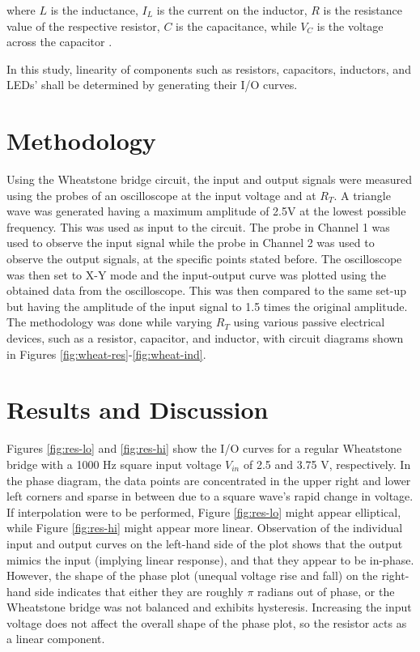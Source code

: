 \documentclass[12pt,a4paper,twoside]{article}
\begin{document}
where $L$ is the inductance, $I_L$ is the current on the inductor, $R$ is the resistance value of the respective resistor, $C$ is the capacitance, while $V_C$ is the voltage across the capacitor \cite{1stODE}.  

In this study, linearity of components such as resistors, capacitors, inductors, and LEDs' shall be determined by generating their I/O curves.

\medskip

\section{Methodology}
\label{sec:Metho}
Using the Wheatstone bridge circuit, the input and output signals were measured using the probes of an oscilloscope at the input voltage and at $R_T$. A triangle wave was generated having a maximum amplitude of 2.5\si{\volt} at the lowest possible frequency. This was used as input to the circuit. The probe in Channel 1 was used to observe the input signal while the probe in Channel 2 was used to observe the output signals, at the specific points stated before. The oscilloscope was then set to X-Y mode and the input-output curve was plotted using the obtained data from the oscilloscope. This was then compared to the same set-up but having the amplitude of the input signal to 1.5 times the original amplitude. The methodology was done while varying $R_T$ using various passive electrical devices, such as a resistor, capacitor, and inductor, with circuit diagrams shown in Figures \ref{fig:wheat-res}-\ref{fig:wheat-ind}.

\section{Results and Discussion}
\label{sec:RnD}
\medskip
Figures \ref{fig:res-lo} and \ref{fig:res-hi} show the I/O curves for a regular Wheatstone bridge with a 1000 Hz square input voltage $V_{in}$ of 2.5 and 3.75 V, respectively. In the phase diagram, the data points are concentrated in the upper right and lower left corners and sparse in between due to a square wave's rapid change in voltage. If interpolation were to be performed, Figure \ref{fig:res-lo} might appear elliptical, while Figure \ref{fig:res-hi} might appear more linear. Observation of the individual input and output curves on the left-hand side of the plot shows that the output mimics the input (implying linear response), and that they appear to be in-phase. However, the shape of the phase plot (unequal voltage rise and fall) on the right-hand side indicates that either they are roughly $\pi$ radians out of phase, or the Wheatstone bridge was not balanced and exhibits hysteresis. Increasing the input voltage does not affect the overall shape of the phase plot, so the resistor acts as a linear component.
\end{document}
